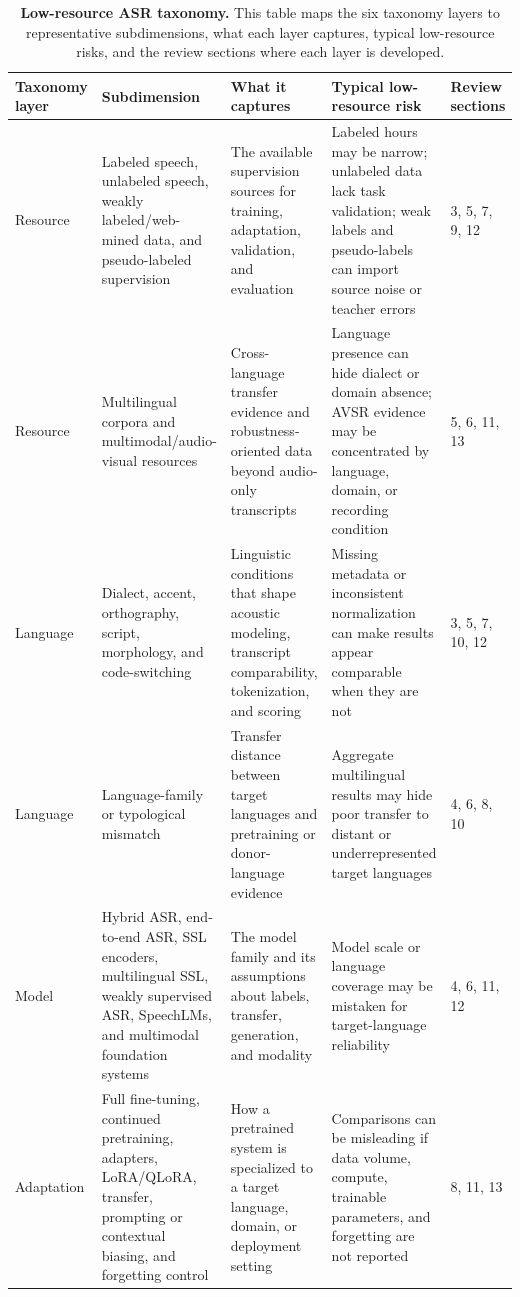 \documentclass[pdflatex,sn-basic]{sn-jnl}
\theoremstyle{thmstyleone}
\theoremstyle{thmstyletwo}
\theoremstyle{thmstylethree}
\begin{document}
\begin{table}[htbp]
\setcounter{table}{0}
\small
\centering
\caption{\textbf{Low-resource ASR taxonomy.} This table maps the six taxonomy layers to representative subdimensions, what each layer captures, typical low-resource risks, and the review sections where each layer is developed.}
\label{tab:1}
\begin{tabularx}{\textwidth}{YYYYY}
\toprule
\textbf{Taxonomy layer} & \textbf{Subdimension} & \textbf{What it captures} & \textbf{Typical low-resource risk} & \textbf{Review sections} \\
\midrule
Resource & Labeled speech, unlabeled speech, weakly labeled/web-mined data, and pseudo-labeled supervision & The available supervision sources for training, adaptation, validation, and evaluation & Labeled hours may be narrow; unlabeled data lack task validation; weak labels and pseudo-labels can import source noise or teacher errors & 3, 5, 7, 9, 12 \\
Resource & Multilingual corpora and multimodal/audio-visual resources & Cross-language transfer evidence and robustness-oriented data beyond audio-only transcripts & Language presence can hide dialect or domain absence; AVSR evidence may be concentrated by language, domain, or recording condition & 5, 6, 11, 13 \\
Language & Dialect, accent, orthography, script, morphology, and code-switching & Linguistic conditions that shape acoustic modeling, transcript comparability, tokenization, and scoring & Missing metadata or inconsistent normalization can make results appear comparable when they are not & 3, 5, 7, 10, 12 \\
Language & Language-family or typological mismatch & Transfer distance between target languages and pretraining or donor-language evidence & Aggregate multilingual results may hide poor transfer to distant or underrepresented target languages & 4, 6, 8, 10 \\
Model & Hybrid ASR, end-to-end ASR, SSL encoders, multilingual SSL, weakly supervised ASR, SpeechLMs, and multimodal foundation systems & The model family and its assumptions about labels, transfer, generation, and modality & Model scale or language coverage may be mistaken for target-language reliability & 4, 6, 11, 12 \\
Adaptation & Full fine-tuning, continued pretraining, adapters, LoRA/QLoRA, transfer, prompting or contextual biasing, and forgetting control & How a pretrained system is specialized to a target language, domain, or deployment setting & Comparisons can be misleading if data volume, compute, trainable parameters, and forgetting are not reported & 8, 11, 13 \\

\end{tabularx}
\end{table}
\end{document}
